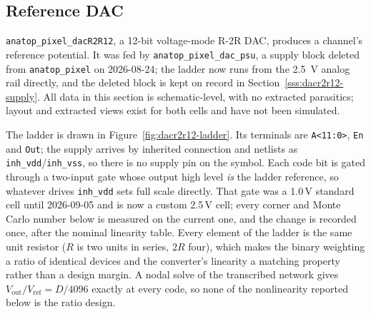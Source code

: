 %
%
%
%

\subsection{Reference DAC}\label{ss:dacr2r12}

\texttt{anatop\_pixel\_dacR2R12}, a 12-bit voltage-mode R-2R DAC, produces a channel's
reference potential. It was fed by \texttt{anatop\_pixel\_dac\_psu}, a supply block
deleted from \texttt{anatop\_pixel} on 2026-08-24; the ladder now runs from the
\SI{2.5}{\volt} analog rail directly, and the deleted block is kept on record in
Section~\ref{sss:dacr2r12-supply}. All data in this section is schematic-level, with no
extracted parasitics; layout and extracted views exist for both cells and have not been
simulated.

The ladder is drawn in Figure~\ref{fig:dacr2r12-ladder}. Its terminals are
\texttt{A<11:0>}, \texttt{En} and \texttt{Out}; the supply arrives by inherited
connection and netlists as \texttt{inh\_vdd}/\texttt{inh\_vss}, so there is no supply pin
on the symbol. Each code bit is gated through a two-input
gate whose output high level \emph{is} the ladder reference, so whatever drives
\texttt{inh\_vdd} sets full scale directly. That gate was a 1.0\,V standard cell
until 2026-09-05 and is now a custom 2.5\,V cell; every corner and Monte Carlo
number below is measured on the current one, and the change is recorded once,
after the nominal linearity table. Every element of the ladder is the same unit resistor (\(R\) is two
units in series, \(2R\) four), which makes the binary weighting a ratio of identical
devices and the converter's linearity a matching property rather than a design margin.
A nodal solve of the transcribed network gives \(V_{\mathrm{out}}/V_{\mathrm{ref}} =
D/4096\) exactly at every code, so none of the nonlinearity reported below is the ratio
design.


